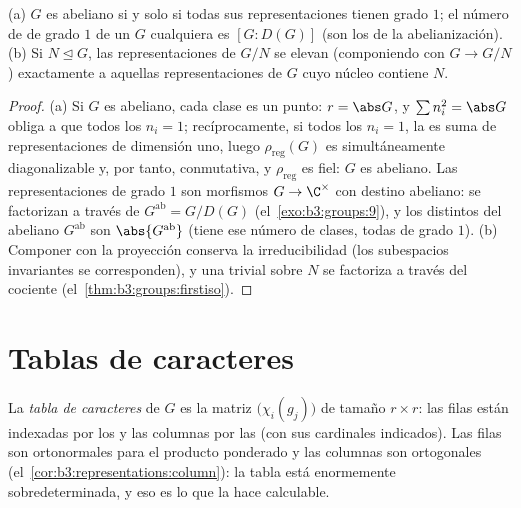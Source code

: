 \begin{proposition}
\label{prop:b3:representations:onedim}
(a) $G$ es abeliano si y solo si todas sus
representaciones 
tienen grado $1$; el número de
 de grado $1$ de un
$G$ cualquiera es $[G : D(G)]$ (son los
 de la
abelianización). (b) Si $N \trianglelefteq G$, las
representaciones  de
$G/N$ se elevan (componiendo con $G \to G/N$) exactamente a aquellas
representaciones  de
$G$ cuyo núcleo contiene $N$.
\end{proposition}

\begin{proof}
(a) Si $G$ es abeliano, cada clase es un punto: $r = \abs G$, y
$\sum n_i^2 = \abs G$ obliga a que todos los $n_i = 1$; recíprocamente,
si todos los $n_i = 1$, la
 es suma
de representaciones de dimensión uno, luego $\rho_{\mathrm{reg}}(G)$ es
simultáneamente diagonalizable y, por tanto, conmutativa, y
$\rho_{\mathrm{reg}}$ es fiel: $G$ es abeliano. Las
representaciones de grado $1$ son
morfismos $G \to \C^\times$ con destino abeliano: se factorizan a través
de $G^{\mathrm{ab}} = G/D(G)$ (el~\cref{exo:b3:groups:9}), y los
 distintos del
abeliano $G^{\mathrm{ab}}$ son $\abs{G^{\mathrm{ab}}}$ (tiene ese número
de clases, todas de grado $1$). (b) Componer con la proyección conserva
la irreducibilidad (los subespacios invariantes se corresponden), y una
 trivial sobre $N$ se
factoriza a través del cociente (el~\cref{thm:b3:groups:firstiso}).
\end{proof}

\section{Tablas de caracteres}

\begin{definition}\label{def:b3:representations:table}
La \emph{tabla de caracteres} de $G$ es la
matriz $\bigl(\chi_i(g_j)\bigr)$ de tamaño $r \times r$: las filas están
indexadas por los 
 y las columnas por las
 (con sus cardinales
indicados). Las filas son ortonormales para el producto ponderado y las
columnas son ortogonales (el~\cref{cor:b3:representations:column}): la
tabla está enormemente sobredeterminada, y eso es lo que la hace
calculable.
\end{definition}

